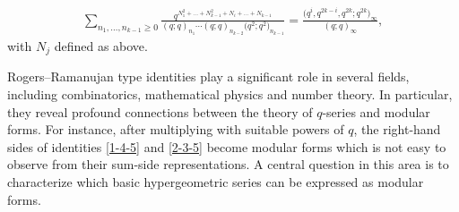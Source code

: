 \documentclass[pdftex]{sigma}
\numberwithin{equation}{section}
\theoremstyle{definition}
\begin{document}
\begin{align}\label{b-identity}
\sum_{n_1, \dots, n_{k-1} \geq 0} \frac{q^{N_1^2 + \dots + N_{k-1}^2 + N_i + \dots + N_{k-1}}}{(q; q)_{n_1} \cdots (q; q)_{n_{k-2}} \bigl(q^2; q^2\bigr)_{n_{k-1}}} = \frac{\bigl(q^i, q^{2k - i}, q^{2k }; q^{2k}\bigr)_{\infty}}{(q; q)_{\infty}},
\end{align}
with $N_j$ defined as above.\par
Rogers--Ramanujan type identities play a significant role in several fields, including combinatorics, mathematical physics and number theory. In particular, they reveal profound connections between the theory of $q$-series and modular forms. For instance, after multiplying with suitable powers of $q$, the right-hand sides of identities \eqref{1-4-5} and \eqref{2-3-5} become modular forms which is not easy to observe from their sum-side representations. A central question in this area is to characterize which basic hypergeometric series can be expressed as modular forms.
\end{document}
